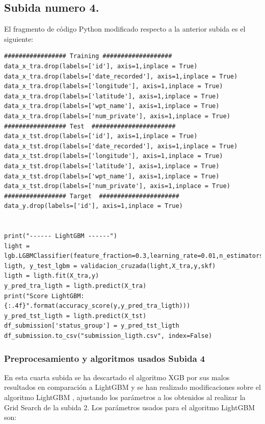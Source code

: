 	\subsection[Subida numero 4]{Subida numero 4.}
	
	El fragmento de código Python modificado respecto a la anterior subida es el siguiente:
	
	\lstset{language=python}
	\begin{lstlisting}[frame=single]
################# Training ###################
data_x_tra.drop(labels=['id'], axis=1,inplace = True)
data_x_tra.drop(labels=['date_recorded'], axis=1,inplace = True)
data_x_tra.drop(labels=['longitude'], axis=1,inplace = True)
data_x_tra.drop(labels=['latitude'], axis=1,inplace = True)
data_x_tra.drop(labels=['wpt_name'], axis=1,inplace = True)
data_x_tra.drop(labels=['num_private'], axis=1,inplace = True)
################# Test  #######################
data_x_tst.drop(labels=['id'], axis=1,inplace = True)
data_x_tst.drop(labels=['date_recorded'], axis=1,inplace = True)
data_x_tst.drop(labels=['longitude'], axis=1,inplace = True)
data_x_tst.drop(labels=['latitude'], axis=1,inplace = True)
data_x_tst.drop(labels=['wpt_name'], axis=1,inplace = True)
data_x_tst.drop(labels=['num_private'], axis=1,inplace = True)
################# Target  ######################
data_y.drop(labels=['id'], axis=1,inplace = True)


print("------ LightGBM ------")
light = lgb.LGBMClassifier(feature_fraction=0.3,learning_rate=0.01,n_estimators=2500,num_leaves=200)
ligth, y_test_lgbm = validacion_cruzada(light,X_tra,y,skf)
ligth = ligth.fit(X_tra,y)
y_pred_tra_ligth = ligth.predict(X_tra)
print("Score LightGBM: {:.4f}".format(accuracy_score(y,y_pred_tra_ligth)))
y_pred_tst_ligth = ligth.predict(X_tst)
df_submission['status_group'] = y_pred_tst_ligth
df_submission.to_csv("submission_ligth.csv", index=False)
	\end{lstlisting}
	
	
	\subsubsection[Preprocesamiento y algoritmos usados Subida 4]{Preprocesamiento y algoritmos usados Subida 4}
	
	En esta cuarta subida se ha descartado el algoritmo XGB por sus malos resultados en comparación a
	LightGBM y se han realizado modificaciones 
	sobre el algoritmo LightGBM , ajustando los parámetros a los obtenidos al realizar la Grid Search
	de la subida 2. Los parámetros usados para el algoritmo LightGBM son: \\
	
